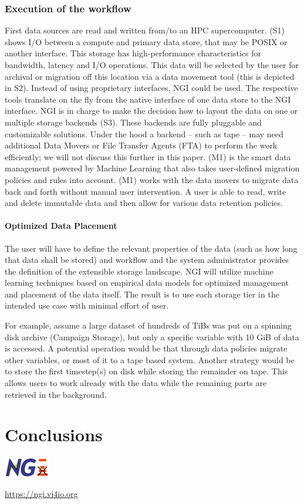 \documentclass[a4paper, twocolumn]{article}
\begin{document}
\subsubsection{Execution of the workflow}

First data sources are read and written from/to an HPC supercomputer.
(S1) shows I/O between a compute and primary data store, that may be POSIX or another interface.
This storage has high-performance characteristics for bandwidth, latency and I/O operations.
This data will be selected by the user for archival or migration off this location via a data movement tool (this is depicted in S2).
Instead of using proprietary interfaces, NGI could be used.
The respective tools translate on the fly from the native interface of one data store to the NGI interface.
NGI is in charge to make the decision how to layout the data on one or multiple storage backends (S3).
These backends are fully pluggable and customizable solutions.
Under the hood a backend -- such as tape -- may need additional Data Movers or File Transfer Agents (FTA) to perform the work efficiently; we will not discuss this further in this paper.
(M1) is the smart data management powered by Machine Learning that also takes user-defined migration policies and rules into account.
(M1) works with the data movers to migrate data back and forth without manual user intervention.
A user is able to read, write and delete immutable data and then allow for various data retention policies.


\paragraph{Optimized Data Placement}
The user will have to define the relevant properties of the data (such as how long that data shall be stored) and workflow and the system administrator provides the definition of the extensible storage landscape.
NGI will utilize machine learning techniques based on empirical data models for optimized management and placement of the data itself.
The result is to use each storage tier in the intended use case with minimal effort of user.

For example, assume a large dataset of hundreds of TiBs was put on a spinning disk archive (Campaign Storage), but only a specific variable with 10 GiB of data is accessed.
A potential operation would be that through data policies migrate other variables, or most of it to a tape based system.
Another strategy would be to store the first timestep(s) on disk while storing the remainder on tape.
This allows users to work already with the data while the remaining parts are retrieved in the background.

\section{Conclusions}



\includegraphics[width=2cm]{ngi-logo}

\noindent\url{https://ngi.vi4io.org}
\end{document}
